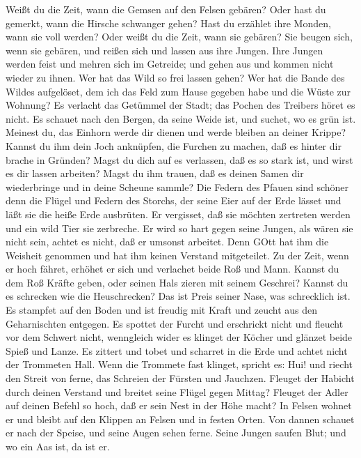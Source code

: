  Weißt du die Zeit, wann die Gemsen auf den Felsen gebären?
Oder hast du gemerkt, wann die Hirsche schwanger gehen? 
Hast du erzählet ihre Monden, wann sie voll werden? Oder weißt du die
Zeit, wann sie gebären?  Sie beugen sich, wenn sie gebären,
und reißen sich und lassen aus ihre Jungen.  Ihre Jungen
werden feist und mehren sich im Getreide; und gehen aus und kommen nicht
wieder zu ihnen.  Wer hat das Wild so frei lassen gehen? Wer
hat die Bande des Wildes aufgelöset,  dem ich das Feld zum
Hause gegeben habe und die Wüste zur Wohnung?  Es verlacht
das Getümmel der Stadt; das Pochen des Treibers höret es nicht.
 Es schauet nach den Bergen, da seine Weide ist, und suchet,
wo es grün ist.  Meinest du, das Einhorn werde dir dienen
und werde bleiben an deiner Krippe?  Kannst du ihm dein
Joch anknüpfen, die Furchen zu machen, daß es hinter dir brache in
Gründen?  Magst du dich auf es verlassen, daß es so stark
ist, und wirst es dir lassen arbeiten?  Magst du ihm
trauen, daß es deinen Samen dir wiederbringe und in deine Scheune
sammle?  Die Federn des Pfauen sind schöner denn die Flügel
und Federn des Storchs,  der seine Eier auf der Erde lässet
und läßt sie die heiße Erde ausbrüten.  Er vergisset, daß
sie möchten zertreten werden und ein wild Tier sie zerbreche.
 Er wird so hart gegen seine Jungen, als wären sie nicht
sein, achtet es nicht, daß er umsonst arbeitet.  Denn GOtt
hat ihm die Weisheit genommen und hat ihm keinen Verstand mitgeteilet.
 Zu der Zeit, wenn er hoch fähret, erhöhet er sich und
verlachet beide Roß und Mann.  Kannst du dem Roß Kräfte
geben, oder seinen Hals zieren mit seinem Geschrei?  Kannst
du es schrecken wie die Heuschrecken? Das ist Preis seiner Nase, was
schrecklich ist.  Es stampfet auf den Boden und ist freudig
mit Kraft und zeucht aus den Geharnischten entgegen.  Es
spottet der Furcht und erschrickt nicht und fleucht vor dem Schwert
nicht,  wenngleich wider es klinget der Köcher und glänzet
beide Spieß und Lanze.  Es zittert und tobet und scharret
in die Erde und achtet nicht der Trommeten Hall.  Wenn die
Trommete fast klinget, spricht es: Hui! und riecht den Streit von ferne,
das Schreien der Fürsten und Jauchzen.  Fleuget der Habicht
durch deinen Verstand und breitet seine Flügel gegen Mittag?
 Fleuget der Adler auf deinen Befehl so hoch, daß er sein
Nest in der Höhe macht?  In Felsen wohnet er und bleibt auf
den Klippen an Felsen und in festen Orten.  Von dannen
schauet er nach der Speise, und seine Augen sehen ferne. 
Seine Jungen saufen Blut; und wo ein Aas ist, da ist er.

